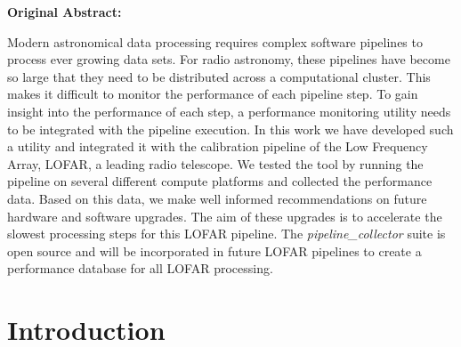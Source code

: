 \setlength\FrameRule{1.5pt}
\begin{frshaded*}
    \textbf{Original Abstract:}


Modern astronomical data processing requires complex software pipelines to process ever growing data sets. For radio astronomy, these pipelines have become so large that they need to be distributed across a computational cluster. This makes it difficult to monitor the performance of each pipeline step. To gain insight into the performance of each  step, a performance monitoring utility needs to be integrated with the pipeline execution. In this work we have developed such a utility and integrated it with the calibration pipeline of the Low Frequency Array, LOFAR, a leading radio telescope. We tested the tool by running the pipeline on several different compute platforms and collected the performance data. Based on this data, we make well informed recommendations on future hardware and software upgrades. The aim of these upgrades is to accelerate the slowest processing steps for this LOFAR pipeline. The \textit{pipeline\_collector} suite is open source and will be incorporated in future LOFAR pipelines to create a performance database for all LOFAR processing. 
\end{frshaded*}






%

\section{\label{sec:ch4_intro}Introduction }
\setcounter{footnote}{0}

